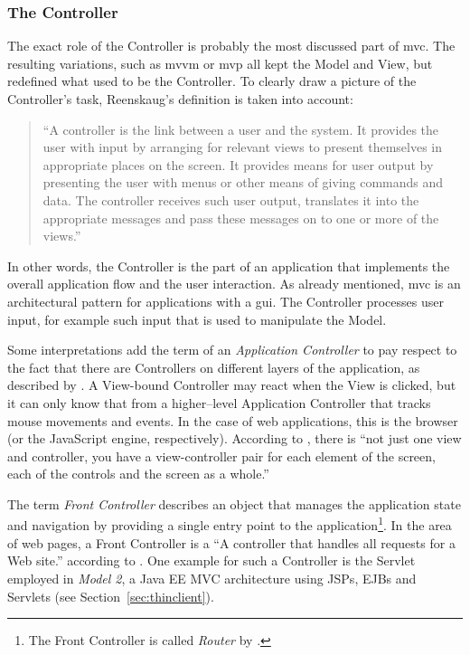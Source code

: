 \subsubsection{The Controller}
The exact role of the Controller is probably the most discussed part of \acl{mvc}. The resulting variations, such as \acl{mvvm} or \acl{mvp} all kept the Model and View, but redefined what used to be the Controller. To clearly draw a picture of the Controller's task, Reenskaug's definition is taken into account:
\begin{quote}
	\enquote{A controller is the link between a user and the system. It provides the user with input by
	arranging for relevant views to present themselves in appropriate places on the screen. It
	provides means for user output by presenting the user with menus or other means of giving
	commands and data. The controller receives such user output, translates it into the appropriate
	messages and pass these messages on to one or more of the views.} \cite{reenskaug79b}
\end{quote}
In other words, the Controller is the part of an application that implements the overall application flow and the user interaction. As already mentioned, \acl{mvc} is an architectural pattern for applications with a \acl{gui}. The Controller processes user input, for example such input that is used to manipulate the Model.

Some interpretations add the term of an \emph{Application Controller} to pay respect to the fact that there are Controllers on different layers of the application, as described by . A View-bound Controller may react when the View is clicked, but it can only know that from a higher--level Application Controller that tracks mouse movements and events. In the case of web applications, this is the browser (or the JavaScript engine, respectively). According to , there is ``not just one view and controller, you have a view-controller pair for each element of the screen, each of the controls and the screen as a whole.''

The term \emph{Front Controller}\label{term:frontcontroller} describes an object that manages the application state and navigation by providing a single entry point to the application\footnote{The Front Controller is called \emph{Router} by .}. In the area of web pages, a Front Controller is a ``A controller that handles all requests for a Web site.'' according to . One example for such a Controller is the Servlet employed in \emph{Model 2}, a Java EE MVC architecture using JSPs, EJBs and Servlets (see Section~\ref{sec:thinclient}).

